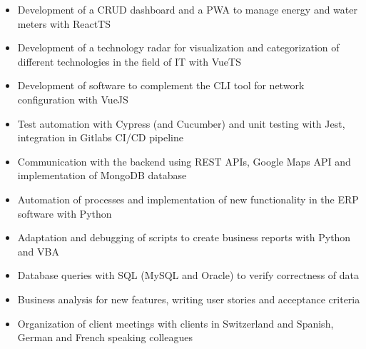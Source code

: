 \documentclass[10pt,a4paper,ragged2e,withhyper]{altacv}
\begin{document}
\begin{paracol}{2}


\begin{itemize}
\item {Development of a CRUD dashboard and a PWA to manage energy and water meters with ReactTS}
\item {Development of a technology radar for visualization and categorization of different technologies in the field of IT with VueTS}
\item {Development of software to complement the CLI tool for network configuration with VueJS}
\item {Test automation with Cypress (and Cucumber) and unit testing with Jest, integration in Gitlabs CI/CD pipeline}
\item {Communication with the backend using REST APIs, Google Maps API and implementation of MongoDB database}
\end{itemize}

\divider


\begin{itemize}
\item {Automation of processes and implementation of new functionality in the ERP software with Python}
\item {Adaptation and debugging of scripts to create business reports with Python and VBA}
\item {Database queries with SQL (MySQL and Oracle) to verify correctness of data}
\item {Business analysis for new features, writing user stories and acceptance criteria}
\item {Organization of client meetings with clients in Switzerland and Spanish, German and French speaking colleagues}
\end{itemize}



\end{paracol}
\end{document}
